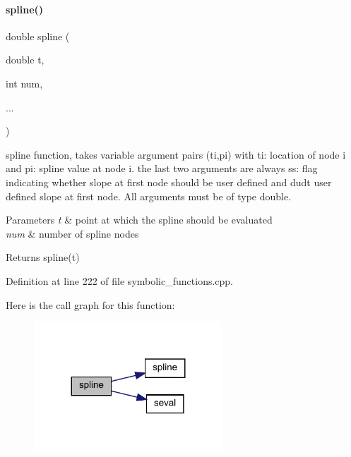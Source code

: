 \paragraph{\texorpdfstring{spline()}{spline()}\hspace{0.1cm}{\footnotesize\ttfamily [2/2]}}
{\footnotesize\ttfamily double spline (\begin{DoxyParamCaption}\item[{double}]{t,  }\item[{int}]{num,  }\item[{}]{... }\end{DoxyParamCaption})}

spline function, takes variable argument pairs (ti,pi) with {\ttfamily ti}\+: location of node i and {\ttfamily pi}\+: spline value at node i. the last two arguments are always {\ttfamily ss}\+: flag indicating whether slope at first node should be user defined and {\ttfamily dudt} user defined slope at first node. All arguments must be of type double.


\begin{DoxyParams}{Parameters}
{\em t} & point at which the spline should be evaluated \\
\hline
{\em num} & number of spline nodes\\
\hline
\end{DoxyParams}
\begin{DoxyReturn}{Returns}
spline(t) 
\end{DoxyReturn}


Definition at line 222 of file symbolic\+\_\+functions.\+cpp.

Here is the call graph for this function\+:
\nopagebreak
\begin{figure}[H]
\begin{center}
\leavevmode
\includegraphics[width=200pt]{namespaceamici_a34f81e95053af0b2d366f7ab636e603a_cgraph}
\end{center}
\end{figure}
\mbox{\label{namespaceamici_aa814c7e3b7d45495d0607f3af88027f6}} 
